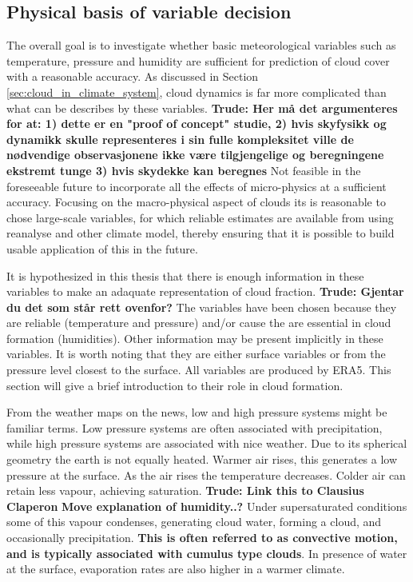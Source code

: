 \subsection{Physical basis of variable decision} \label{sec:ecc}
The overall goal is to investigate whether basic meteorological variables such as temperature, pressure and humidity are sufficient for prediction of cloud cover with a reasonable accuracy. As discussed in Section \ref{sec:cloud_in_climate_system}, cloud dynamics is far more complicated than what can be describes by these variables. \textbf{Trude: Her må det argumenteres for at: 1) dette er en "proof of concept" studie, 2) hvis skyfysikk og dynamikk skulle representeres i sin fulle kompleksitet ville de nødvendige observasjonene ikke være tilgjengelige og beregningene ekstremt tunge 3) hvis skydekke kan beregnes }
Not feasible in the foreseeable future to incorporate all the effects of micro-physics at a sufficient accuracy. Focusing on the macro-physical aspect of clouds its is reasonable to chose large-scale variables, for which reliable estimates are available from using reanalyse and other climate model, thereby ensuring that it is possible to build usable application of this in the future.

It is hypothesized in this thesis that there is enough information in these variables to make an adaquate representation of cloud fraction. \textbf{Trude: Gjentar du det som står rett ovenfor?} The variables have been chosen because they are reliable (temperature and pressure) and/or cause the are essential in cloud formation (humidities). Other information may be present implicitly in these variables. It is worth noting that they are either surface variables or from the pressure level closest to the surface. All variables are produced by ERA5. This section will give a brief introduction to their role in cloud formation. 

From the weather maps on the news, low and high pressure systems might be familiar terms. Low pressure systems are often associated with precipitation, while high pressure systems are associated with nice weather. Due to its spherical geometry the earth is not equally heated. Warmer air rises, this generates a low pressure at the surface. As the air rises the temperature decreases. Colder air can retain less vapour, achieving saturation. \textbf{Trude: Link this to Clausius Claperon} \textbf{ Move explanation of humidity..?} Under supersaturated conditions some of this vapour condenses, generating cloud water, forming a cloud, and occasionally precipitation. \textbf{This is often referred to as convective motion, and is typically associated with cumulus type clouds}. In presence of water at the surface, evaporation rates are also higher in a warmer climate. 

